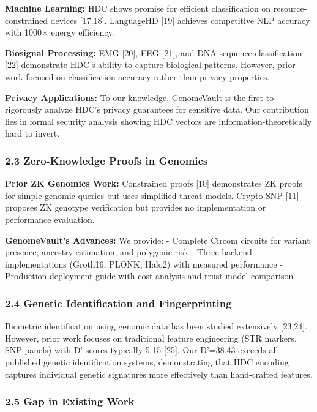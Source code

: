 \documentclass[
  11pt,
]{article}
\begin{document}
\textbf{Machine Learning:} HDC shows promise for efficient
classification on resource-constrained devices {[}17,18{]}. LanguageHD
{[}19{]} achieves competitive NLP accuracy with 1000× energy efficiency.

\textbf{Biosignal Processing:} EMG {[}20{]}, EEG {[}21{]}, and DNA
sequence classification {[}22{]} demonstrate HDC's ability to capture
biological patterns. However, prior work focused on classification
accuracy rather than privacy properties.

\textbf{Privacy Applications:} To our knowledge, GenomeVault is the
first to rigorously analyze HDC's privacy guarantees for sensitive data.
Our contribution lies in formal security analysis showing HDC vectors
are information-theoretically hard to invert.

\subsubsection{2.3 Zero-Knowledge Proofs in
Genomics}\label{zero-knowledge-proofs-in-genomics}

\textbf{Prior ZK Genomics Work:} Constrained proofs {[}10{]}
demonstrates ZK proofs for simple genomic queries but uses simplified
threat models. Crypto-SNP {[}11{]} proposes ZK genotype verification but
provides no implementation or performance evaluation.

\textbf{GenomeVault's Advances:} We provide: - Complete Circom circuits
for variant presence, ancestry estimation, and polygenic risk - Three
backend implementations (Groth16, PLONK, Halo2) with measured
performance - Production deployment guide with cost analysis and trust
model comparison

\subsubsection{2.4 Genetic Identification and
Fingerprinting}\label{genetic-identification-and-fingerprinting}

Biometric identification using genomic data has been studied extensively
{[}23,24{]}. However, prior work focuses on traditional feature
engineering (STR markers, SNP panels) with D' scores typically 5-15
{[}25{]}. Our D'=38.43 exceeds all published genetic identification
systems, demonstrating that HDC encoding captures individual genetic
signatures more effectively than hand-crafted features.

\subsubsection{2.5 Gap in Existing Work}\label{gap-in-existing-work}
\end{document}
